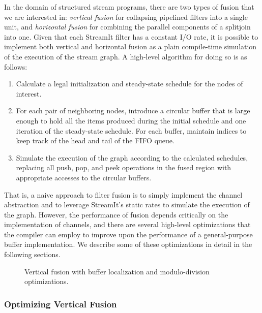 In the domain of structured stream programs, there are two types of
fusion that we are interested in: {\it vertical fusion} for collapsing
pipelined filters into a single unit, and {\it horizontal fusion} for
combining the parallel components of a splitjoin into one.  Given that
each StreamIt filter has a constant I/O rate, it is possible to
implement both vertical and horizontal fusion as a plain compile-time
simulation of the execution of the stream graph.  A high-level
algorithm for doing so is as follows:
\begin{enumerate}
\item Calculate a legal initialization and steady-state schedule for
the nodes of interest.

\item For each pair of neighboring nodes, introduce a circular buffer
that is large enough to hold all the items produced during the initial
schedule and one iteration of the steady-state schedule.  For each
buffer, maintain indices to keep track of the head and tail of the
FIFO queue.

\item Simulate the execution of the graph according to the calculated
schedules, replacing all push, pop, and peek operations in the fused
region with appropriate accesses to the circular buffers.
\end{enumerate}
That is, a naive approach to filter fusion is to simply implement the
channel abstraction and to leverage StreamIt's static rates to
simulate the execution of the graph.  However, the performance of
fusion depends critically on the implementation of channels, and there
are several high-level optimizations that the compiler can employ to
improve upon the performance of a general-purpose buffer
implementation.  We describe some of these optimizations in detail in
the following sections.

\begin{figure}
\centering
{}
\vspace{-6pt}
\caption{\protect\small Vertical fusion with buffer localization and
modulo-division optimizations. \label{fig:fuse-pipe}}
\vspace{-6pt}
\end{figure}

\subsubsection{Optimizing Vertical Fusion}

